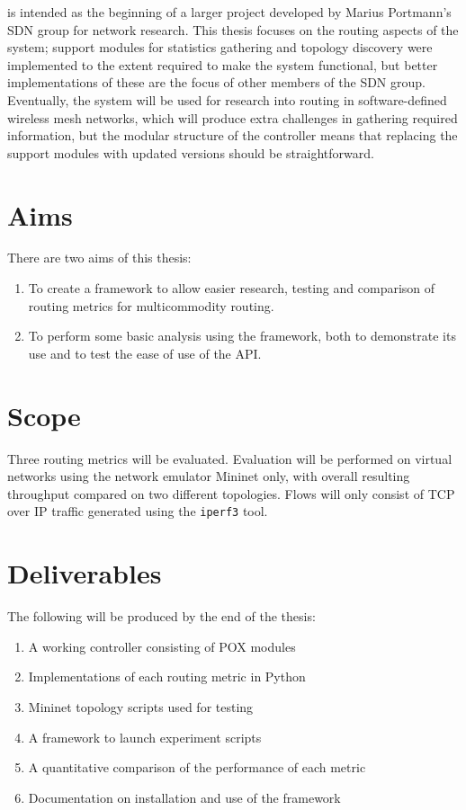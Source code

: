 \thesis{} is intended as the beginning of a larger project developed by Marius Portmann's SDN group for network research. This thesis focuses on the routing aspects of the system; support modules for statistics gathering and topology discovery were implemented to the extent required to make the system functional, but better implementations of these are the focus of other members of the SDN group. Eventually, the system will be used for research into routing in software-defined wireless mesh networks, which will produce extra challenges in gathering required information, but the modular structure of the controller means that replacing the support modules with updated versions should be straightforward.

\section{Aims}

There are two aims of this thesis:

\begin{enumerate}
  \item To create a framework to allow easier research, testing and comparison of routing metrics for multicommodity routing.
  \item To perform some basic analysis using the framework, both to demonstrate its use and to test the ease of use of the API.
\end{enumerate}

\section{Scope}
Three routing metrics will be evaluated. Evaluation will be performed on virtual networks using the network emulator Mininet only, with overall resulting throughput compared on two different topologies. Flows will only consist of TCP over IP traffic generated using the \texttt{iperf3} tool.

\section{Deliverables}
The following will be produced by the end of the thesis:

\begin{enumerate}
  \item A working controller consisting of POX modules
  \item Implementations of each routing metric in Python
  \item Mininet topology scripts used for testing
  \item A framework to launch experiment scripts
  \item A quantitative comparison of the performance of each metric
  \item Documentation on installation and use of the framework
\end{enumerate}
